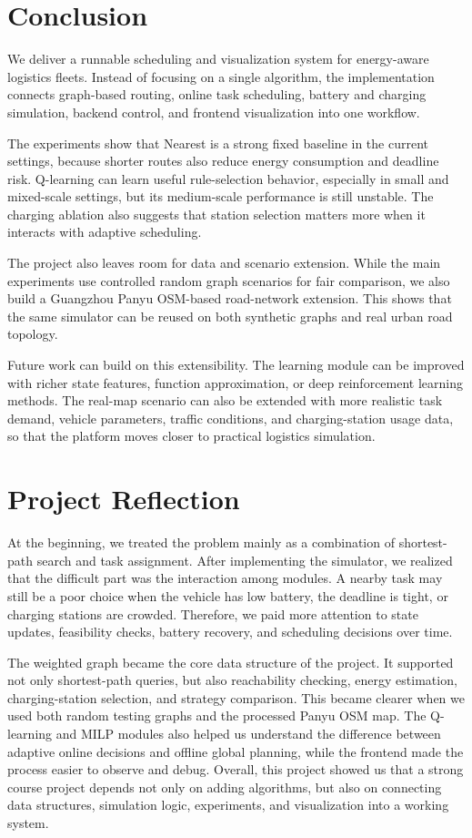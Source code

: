 \section{Conclusion}

We deliver a runnable scheduling and visualization system for energy-aware logistics fleets. Instead of focusing on a single algorithm, the implementation connects graph-based routing, online task scheduling, battery and charging simulation, backend control, and frontend visualization into one workflow.

The experiments show that Nearest is a strong fixed baseline in the current settings, because shorter routes also reduce energy consumption and deadline risk. Q-learning can learn useful rule-selection behavior, especially in small and mixed-scale settings, but its medium-scale performance is still unstable. The charging ablation also suggests that station selection matters more when it interacts with adaptive scheduling.

The project also leaves room for data and scenario extension. While the main experiments use controlled random graph scenarios for fair comparison, we also build a Guangzhou Panyu OSM-based road-network extension. This shows that the same simulator can be reused on both synthetic graphs and real urban road topology.

Future work can build on this extensibility. The learning module can be improved with richer state features, function approximation, or deep reinforcement learning methods. The real-map scenario can also be extended with more realistic task demand, vehicle parameters, traffic conditions, and charging-station usage data, so that the platform moves closer to practical logistics simulation.

\section{Project Reflection}

At the beginning, we treated the problem mainly as a combination of shortest-path search and task assignment. After implementing the simulator, we realized that the difficult part was the interaction among modules. A nearby task may still be a poor choice when the vehicle has low battery, the deadline is tight, or charging stations are crowded. Therefore, we paid more attention to state updates, feasibility checks, battery recovery, and scheduling decisions over time.

The weighted graph became the core data structure of the project. It supported not only shortest-path queries, but also reachability checking, energy estimation, charging-station selection, and strategy comparison. This became clearer when we used both random testing graphs and the processed Panyu OSM map. The Q-learning and MILP modules also helped us understand the difference between adaptive online decisions and offline global planning, while the frontend made the process easier to observe and debug. Overall, this project showed us that a strong course project depends not only on adding algorithms, but also on connecting data structures, simulation logic, experiments, and visualization into a working system.
